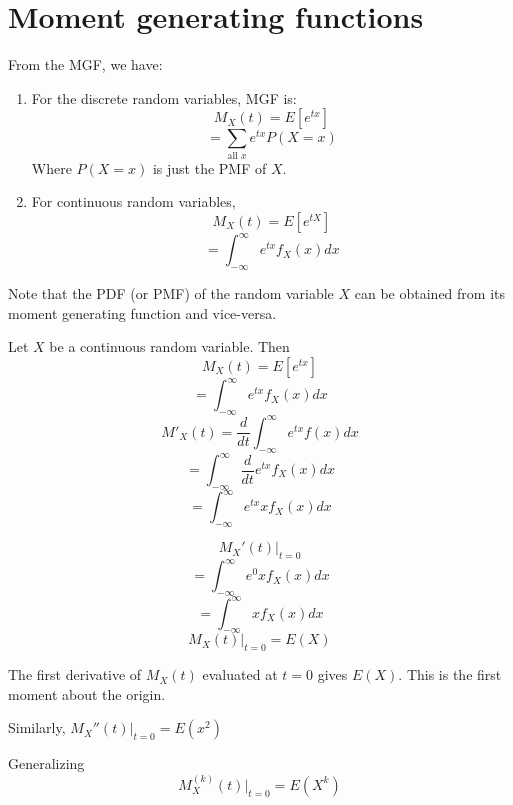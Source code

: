 
\section{Moment generating functions}

From the MGF, we have:
\begin{enumerate}
    \item For the discrete random variables, MGF is:
    $$M_X (t) = E[e^{tx}]$$
    $$= \sum_{\text{all } x} e^{tx} P(X = x)$$
    Where $P(X = x)$ is just the PMF of $X$.
    \item For continuous random variables, 
    $$M_X (t) = E[e^{tX}]$$
    $$ = \int_{-\infty}^{\infty} e^{tx} f_X (x) dx$$
\end{enumerate}

Note that the PDF (or PMF) of the random variable $X$ can be obtained from its moment generating function and vice-versa.

Let $X$ be a continuous random variable. Then 
$$M_X (t) = E[e^{tx}]$$
$$ = \int_{-\infty}^{\infty} e^{tx} f_X (x) dx$$
$$M'_X (t) = \frac{d}{dt} \int_{-\infty}^{\infty} e^{tx} f(x) dx$$
$$ = \int_{-\infty}^{\infty} \frac{d}{dt} e^{tx} f_X (x) dx$$
$$ = \int_{-\infty}^{\infty} e^{tx} x f_X (x) dx$$

$$M_X ' (t) \Big|_{t=0} $$
$$ = \int_{-\infty}^{\infty} e^{0} x f_X (x) dx$$
$$ = \int_{-\infty}^{\infty} x f_X (x) dx$$
$$M_X (t) \big|_{t=0} = E(X)$$

The first derivative of $M_X (t)$ evaluated at $t =0$ gives $E(X)$. This is the first moment about the origin.

Similarly, $M_X'' (t) \big|_{t=0} = E(x^2)$

Generalizing
$$M_X^{(k)} (t) \big|_{t=0} = E(X^k)$$

